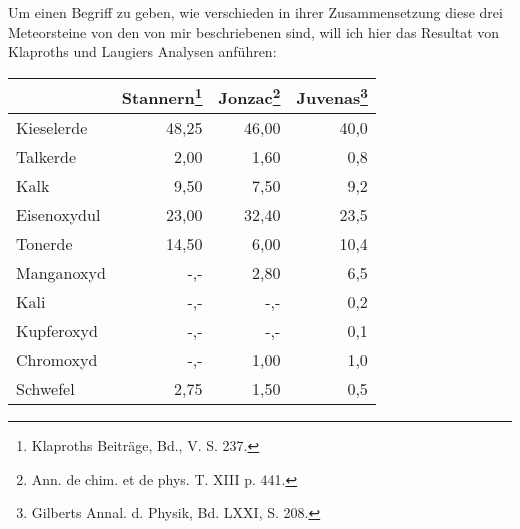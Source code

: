 \documentclass[a4paper, 11pt, oneside]{article}
\begin{document}
Um einen Begriff zu geben, wie verschieden in ihrer Zusammensetzung diese drei Meteorsteine von den von mir beschriebenen sind, will ich hier das Resultat von Klaproths und Laugiers Analysen anführen:
\begin{center}
\begin{tabular}{ |l|r|r|r| }
    \hline
     & Stannern\footnote{Klaproths Beiträge, Bd., V. S. 237.} & Jonzac\footnote{Ann. de chim. et de phys. T. XIII p. 441.} & Juvenas\footnote{Gilberts Annal. d. Physik, Bd. LXXI, S. 208.}\\\hline
    Kieselerde & 48,25 & 46,00 & 40,0\\\hline
    Talkerde & 2,00 & 1,60 & 0,8\\\hline
    Kalk & 9,50 & 7,50 & 9,2\\\hline
    Eisenoxydul & 23,00 & 32,40 & 23,5\\\hline
    Tonerde & 14,50 & 6,00 & 10,4\\\hline
    Manganoxyd & -,- & 2,80 & 6,5\\\hline
    Kali & -,- & -,- & 0,2\\\hline
    Kupferoxyd & -,- & -,- & 0,1\\\hline
    Chromoxyd & -,- & 1,00 & 1,0\\\hline
    Schwefel & 2,75 & 1,50 & 0,5\\
    \hline
\end{tabular}
\end{center}
\end{document}
